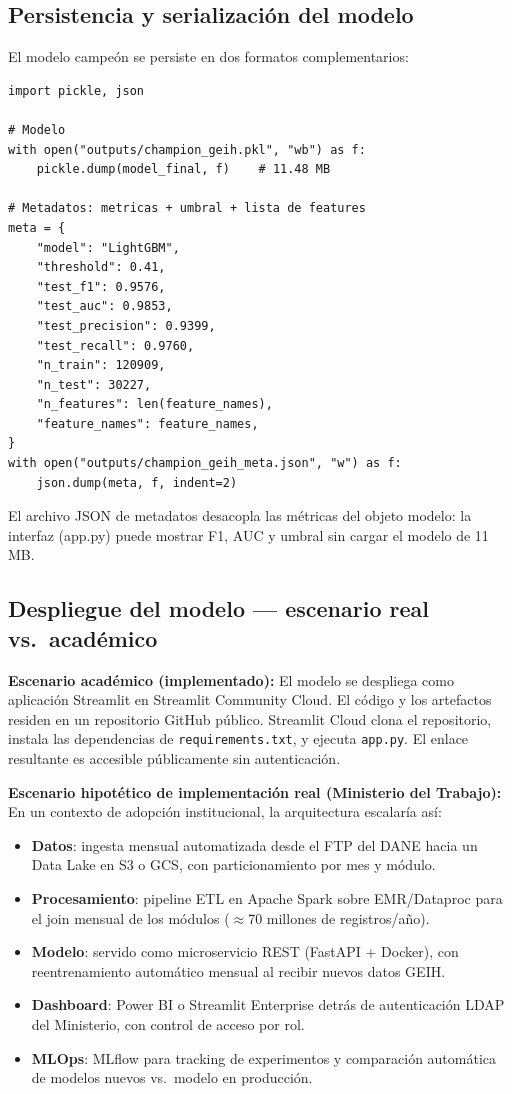 \documentclass[12pt, a4paper]{article}
\begin{document}
\subsection{Persistencia y serialización del modelo}

El modelo campeón se persiste en dos formatos complementarios:

\begin{lstlisting}[caption={Serialización del modelo y metadatos — 4.Modelamiento.ipynb}]
import pickle, json

# Modelo
with open("outputs/champion_geih.pkl", "wb") as f:
    pickle.dump(model_final, f)    # 11.48 MB

# Metadatos: metricas + umbral + lista de features
meta = {
    "model": "LightGBM",
    "threshold": 0.41,
    "test_f1": 0.9576,
    "test_auc": 0.9853,
    "test_precision": 0.9399,
    "test_recall": 0.9760,
    "n_train": 120909,
    "n_test": 30227,
    "n_features": len(feature_names),
    "feature_names": feature_names,
}
with open("outputs/champion_geih_meta.json", "w") as f:
    json.dump(meta, f, indent=2)
\end{lstlisting}

El archivo JSON de metadatos desacopla las métricas del objeto modelo: la interfaz
(app.py) puede mostrar F1, AUC y umbral sin cargar el modelo de 11 MB.

\subsection{Despliegue del modelo — escenario real vs.\ académico}

\textbf{Escenario académico (implementado):} El modelo se despliega como aplicación
Streamlit en Streamlit Community Cloud. El código y los artefactos residen en un
repositorio GitHub público. Streamlit Cloud clona el repositorio, instala las
dependencias de \texttt{requirements.txt}, y ejecuta \texttt{app.py}. El enlace
resultante es accesible públicamente sin autenticación.

\textbf{Escenario hipotético de implementación real (Ministerio del Trabajo):}
En un contexto de adopción institucional, la arquitectura escalaría así:
\begin{itemize}[noitemsep]
  \item \textbf{Datos}: ingesta mensual automatizada desde el FTP del DANE
  hacia un Data Lake en S3 o GCS, con particionamiento por mes y módulo.
  \item \textbf{Procesamiento}: pipeline ETL en Apache Spark sobre EMR/Dataproc
  para el join mensual de los módulos ($\approx$70 millones de registros/año).
  \item \textbf{Modelo}: servido como microservicio REST (FastAPI + Docker),
  con reentrenamiento automático mensual al recibir nuevos datos GEIH.
  \item \textbf{Dashboard}: Power BI o Streamlit Enterprise detrás de
  autenticación LDAP del Ministerio, con control de acceso por rol.
  \item \textbf{MLOps}: MLflow para tracking de experimentos y comparación
  automática de modelos nuevos vs.\ modelo en producción.
\end{itemize}
\end{document}
